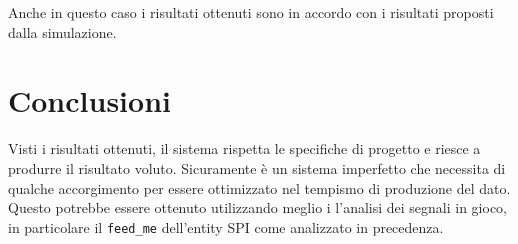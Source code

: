 \documentclass[titlepage]{report}
\begin{document}
		Anche in questo caso i risultati ottenuti sono in accordo con i risultati proposti dalla simulazione.

\chapter*{Conclusioni}
\label{ch:conclusioni}
	
	Visti i risultati ottenuti, il sistema rispetta le specifiche di progetto e riesce a produrre il risultato voluto. Sicuramente è un sistema imperfetto che necessita di qualche accorgimento per essere ottimizzato nel tempismo di produzione del dato. Questo potrebbe essere ottenuto utilizzando meglio i l'analisi dei segnali in gioco, in particolare il \texttt{feed\_me} dell'entity SPI come analizzato in precedenza.


\listoffigures
\listoftables
\lstlistoflistings
\end{document}
